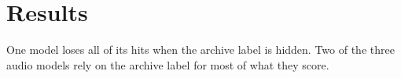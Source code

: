 \section{Results}
One model loses all of its hits when the archive label is hidden. Two of the three audio models rely on the archive label for most of what they score.
